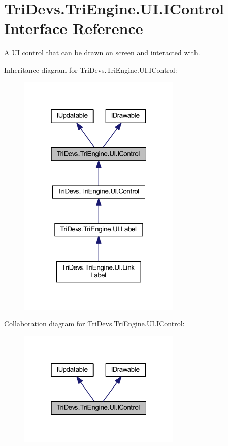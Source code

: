\hypertarget{interface_tri_devs_1_1_tri_engine_1_1_u_i_1_1_i_control}{\section{Tri\-Devs.\-Tri\-Engine.\-U\-I.\-I\-Control Interface Reference}
\label{interface_tri_devs_1_1_tri_engine_1_1_u_i_1_1_i_control}
}


A \hyperlink{namespace_tri_devs_1_1_tri_engine_1_1_u_i}{U\-I} control that can be drawn on screen and interacted with.  




Inheritance diagram for Tri\-Devs.\-Tri\-Engine.\-U\-I.\-I\-Control\-:
\nopagebreak
\begin{figure}[H]
\begin{center}
\leavevmode
\includegraphics[width=220pt]{interface_tri_devs_1_1_tri_engine_1_1_u_i_1_1_i_control__inherit__graph}
\end{center}
\end{figure}


Collaboration diagram for Tri\-Devs.\-Tri\-Engine.\-U\-I.\-I\-Control\-:
\nopagebreak
\begin{figure}[H]
\begin{center}
\leavevmode
\includegraphics[width=220pt]{interface_tri_devs_1_1_tri_engine_1_1_u_i_1_1_i_control__coll__graph}
\end{center}
\end{figure}
